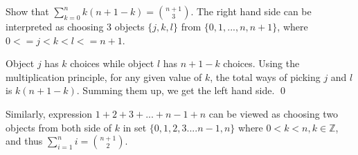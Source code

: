 \begin{exec}
  Show that $\sum_{k=0}^{n} k(n+1-k)={n+1 \choose 3}$.
  \tcblower
  The right hand side can be interpreted as choosing 3 objects $\{j,k,l\}$ from $\{0,1,...,n,n+1\}$, where $0<=j<k<l<=n+1$.

  Object $j$ has $k$ choices while object $l$ has $n+1-k$ choices. Using the multiplication principle, for any given value of $k$, the total ways of picking $j$ and $l$ is $k(n+1-k)$. Summing them up, we get the left hand side.
  \qed

  Similarly, expression $1+2+3+...+n-1+n$ can be viewed as choosing two objects from both side of $k$ in set $\{0,1,2,3....n-1,n\}$ where $0<k<n, k \in \mathbb{Z}$, and thus $\sum_{i=1}^{n}i={n+1 \choose 2}$.
\end{exec}